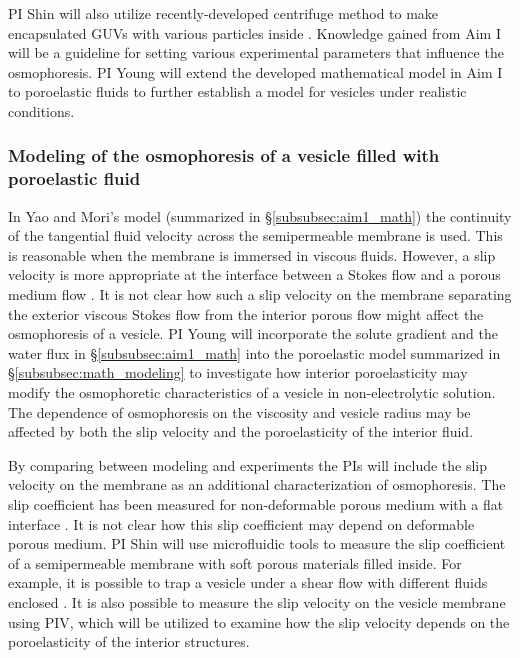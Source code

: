 \documentclass[11pt]{article}
\begin{document}
%
  PI Shin  will also utilize 
  recently-developed centrifuge method to make encapsulated GUVs with various particles inside \cite{natsume2017}.
  Knowledge gained from Aim I will be a guideline for setting various experimental parameters that influence the osmophoresis. PI Young  will extend the 
  developed mathematical model in Aim I to poroelastic fluids to further establish a model for vesicles under realistic conditions.

 
\subsubsection{Modeling of the osmophoresis of a vesicle filled with poroelastic fluid\label{subsubsec:math_model_porous_vesicle}}
In Yao and Mori's model (summarized in \S \ref{subsubsec:aim1_math}) the continuity of the tangential fluid velocity across the semipermeable membrane is used.
This is reasonable when the membrane is immersed in viscous fluids. 
However, a slip velocity is more appropriate at the interface between a Stokes flow and a porous medium flow \cite{MacMinn2016_PRApplied,Angot2017_PRE}.
It is not clear how such a slip velocity on the membrane separating the exterior viscous Stokes flow from the interior porous flow might affect the osmophoresis of a vesicle. 
PI Young will incorporate the solute gradient and the water flux in \S \ref{subsubsec:aim1_math} into the poroelastic model summarized in \S \ref{subsubsec:math_modeling} 
to investigate how interior poroelasticity may modify the osmophoretic characteristics of a vesicle in non-electrolytic solution. 
The dependence of osmophoresis on the viscosity and vesicle radius may be affected by both the slip velocity and
the poroelasticity of the interior fluid. 

By comparing between modeling and experiments the PIs will include the slip velocity on the membrane as an additional characterization of 
osmophoresis. The slip coefficient has been measured for non-deformable porous medium with a flat interface  \cite{BeaversJoseph1967_JFM,LaugaBrennerStone2007_chapter19,LaugaStone2003_JFM}. 
It is not clear how this slip coefficient may 
depend on deformable porous medium. PI Shin will use microfluidic tools to measure the slip coefficient of a semipermeable membrane with soft porous 
materials filled inside. For example, it is possible to trap a vesicle under a shear flow with different fluids enclosed \cite{shin2015}. It is also possible to measure the slip velocity on the vesicle membrane using PIV, which will be utilized to examine how the slip velocity
depends on the poroelasticity of the interior structures.
\end{document}
